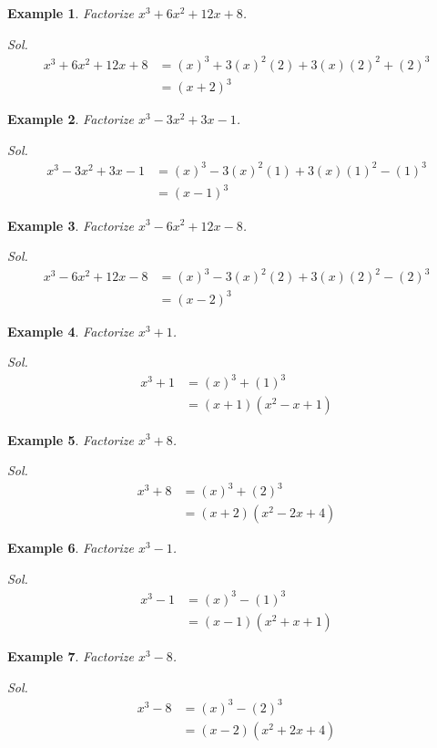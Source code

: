 \documentclass[12pt]{article}
\newtheorem{example}{Example}
\begin{document}
    \begin{example}
        Factorize $x^3+6x^2+12x+8$.
    \end{example}
    \textit{ Sol. }\begin{align*}
        x^3+6x^2+12x+8&=(x)^3+3(x)^2(2)+3(x)(2)^2+(2)^3\\
        &=(x+2)^3
    \end{align*}

    \begin{example}
        Factorize $x^3-3x^2+3x-1$.
    \end{example}
    \textit{ Sol. }\begin{align*}
        x^3-3x^2+3x-1&=(x)^3-3(x)^2(1)+3(x)(1)^2-(1)^3\\
        &=(x-1)^3
    \end{align*}

    \begin{example}
        Factorize $x^3-6x^2+12x-8$.
    \end{example}
    \textit{ Sol. }\begin{align*}
        x^3-6x^2+12x-8&=(x)^3-3(x)^2(2)+3(x)(2)^2-(2)^3\\
        &=(x-2)^3
    \end{align*}

    \begin{example}
        Factorize $x^3+1$.
    \end{example}
    \textit{ Sol. }\begin{align*}
        x^3+1&=(x)^3+(1)^3\\
        &=(x+1)(x^2-x+1)
    \end{align*}

    \begin{example}
        Factorize $x^3+8$.
    \end{example}
    \textit{ Sol. }\begin{align*}
        x^3+8&=(x)^3+(2)^3\\
        &=(x+2)(x^2-2x+4)
    \end{align*}

    \begin{example}
        Factorize $x^3-1$.
    \end{example}
    \textit{ Sol. }\begin{align*}
        x^3-1&=(x)^3-(1)^3\\
        &=(x-1)(x^2+x+1)
    \end{align*}

    \begin{example}
        Factorize $x^3-8$.
    \end{example}
    \textit{ Sol. }\begin{align*}
        x^3-8&=(x)^3-(2)^3\\
        &=(x-2)(x^2+2x+4)
    \end{align*}
\end{document}
